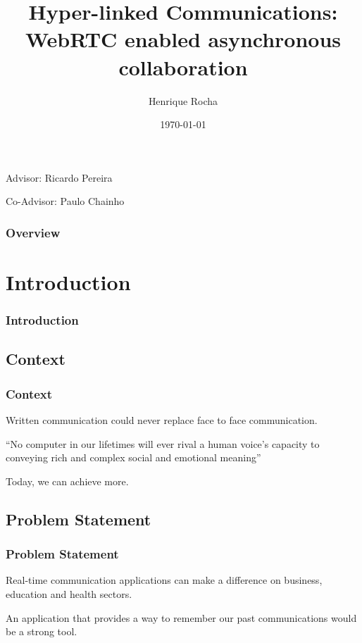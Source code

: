 \documentclass[t]{beamer}
\title[Hyper-linked Communications]{Hyper-linked Communications: WebRTC enabled
asynchronous collaboration} %
\author{Henrique Rocha} %
\institute[IST] %
{
Instituto Superior Técnico \\
Universidade de Lisboa \\ %
\medskip
\textit{henrique.rocha@tecnico.ulisboa.pt} %
}
\date{\today} %
\newcommand{\nologo}{\setbeamertemplate{logo}{}}
\newcommand{\myquote}[2]{\begin{exampleblock}{}{\large ``#1''}\vskip5mm\hspace*\fill{\small--- #2}\end{exampleblock}}
\begin{document}
{
\begin{frame}
\titlepage %
\small
Advisor: Ricardo Pereira

Co-Advisor: Paulo Chainho

\end{frame}
}

\begin{frame}[t]
\frametitle{Overview} 
\tableofcontents[hidesubsections]


\end{frame}



\section{Introduction}\label{intro}

\begin{frame}[t,shrink]
\frametitle{Introduction} 

\end{frame}

	\subsection{Context}   %
		\begin{frame}[c]
		\frametitle{Context}
		Written communication could never replace face to face communication.

		\myquote{No computer in our lifetimes will ever rival a human voice's capacity to conveying rich and complex social and emotional meaning}{Geddes, Martin}

		Today, we can achieve more.
		\end{frame}

	\subsection{Problem Statement} %
  		\begin{frame}[c]
		\frametitle{Problem Statement}
		Real-time communication applications can make a difference on business, education and health sectors.

		\vfill

		An application that provides a way to remember our past communications would be a strong tool.
		\end{frame}
\end{document}
